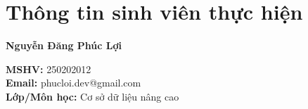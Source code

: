 \chapter*{Thông tin sinh viên thực hiện}

\vspace{1cm}

\noindent
\begin{minipage}[t]{0.3\textwidth}
    \vspace{0pt}
    \centering
\end{minipage}
\hfill
\begin{minipage}[t]{0.65\textwidth}
    \vspace{0pt}
    \textbf{\Large Nguyễn Đăng Phúc Lợi}
    
    \vspace{0.3cm}
    
    \textbf{MSHV:} 250202012 \\
    \textbf{Email:} phucloi.dev@gmail.com \\
    \textbf{Lớp/Môn học:} Cơ sở dữ liệu nâng cao
    
\end{minipage}%

\vspace{2cm}
